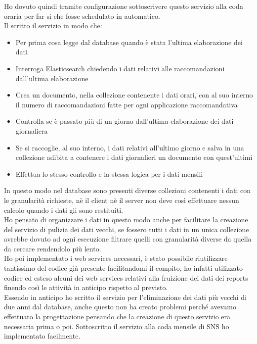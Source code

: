 \documentclass[a4paper, 12pt, twoside, openright]{book}
\begin{document}
Ho dovuto quindi tramite configurazione sottoscrivere questo servizio alla coda oraria per far si che fosse schedulato in automatico.\\
Il scritto il servizio in modo che:
\begin{itemize}
	\item Per prima cosa legge dal database quando è stata l'ultima elaborazione dei dati
	\item Interroga Elasticsearch chiedendo i dati relativi alle raccomandazioni dall'ultima elaborazione 
	\item Crea un documento, nella collezione contenente i dati orari, con al suo interno il numero di raccomandazioni fatte per ogni applicazione raccomandativa
	\item Controlla se è passato più di un giorno dall'ultima elaborazione dei dati giornaliera
	\item Se si raccoglie, al suo interno, i dati relativi all'ultimo giorno e salva in una collezione adibita a contenere i dati giornalieri un documento con quest'ultimi
	\item Effettua lo stesso controllo e la stessa logica per i dati mensili
\end{itemize}
In questo modo nel database sono presenti diverse collezioni contenenti i dati con le granularità richieste, nè il client nè il server non deve così effettuare nessun calcolo quando i dati gli sono restituiti.\\
Ho pensato di organizzare i dati in questo modo anche per facilitare la creazione del servizio di pulizia dei dati vecchi, se fossero tutti i dati in un unica collezione avrebbe dovuto ad ogni esecuzione filtrare quelli con granularità diverse da quella da cercare rendendolo più lento.\\
Ho poi implementato i web services necessari, è stato possibile riutilizzare tantissimo del codice già presente facilitandomi il compito, ho infatti utilizzato codice ed esteso alcuni dei web services relativi alla fruizione dei dati dei reports finendo così le attività in anticipo rispetto al previsto.\\
Essendo in anticipo ho scritto il servizio per l'eliminazione dei dati più vecchi di due anni dal database, anche questo non ha creato problemi perché avevamo effettuato la progettazione pensando che la creazione di questo servizio era necessaria prima o poi. Sottoscritto il servizio alla coda mensile di SNS ho implementato facilmente.\\
\end{document}
